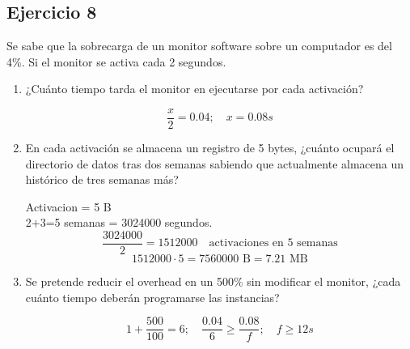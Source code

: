 \subsection{Ejercicio 8}
\noindent
Se sabe que la sobrecarga de un monitor software sobre un computador es del 4\%. Si el monitor se activa cada 2 segundos.
\begin{enumerate}
    \item ¿Cuánto tiempo tarda el monitor en ejecutarse por cada activación?
\begin{tcolorbox}[colback=white,colframe=cyan!50!black,fonttitle=\bfseries]
\[
\dfrac{x}{2}=0.04; \quad x=0.08s
\]
\end{tcolorbox}    
    \item En cada activación se almacena un registro de 5 bytes, ¿cuánto ocupará el directorio de datos tras dos semanas sabiendo que actualmente almacena un histórico de tres semanas más?
\begin{tcolorbox}[colback=white,colframe=cyan!50!black,fonttitle=\bfseries]
Activacion = 5 B\\
2+3=5 semanas = 3024000 segundos.
\[
\dfrac{3024000}{2}=1512000\quad\text{activaciones en 5 semanas}
\]
\[
1512000\cdot 5=7560000\text{ B}=7.21\text{ MB}
\]
\end{tcolorbox}    
    \item Se pretende reducir el overhead en un 500\% sin modificar el monitor, ¿cada cuánto tiempo deberán programarse las instancias?
\begin{tcolorbox}[colback=white,colframe=cyan!50!black,fonttitle=\bfseries]
\[
1+\dfrac{500}{100}=6;\quad \dfrac{0.04}{6}\geq\dfrac{0.08}{f};\quad f\geq 12s
\]
\end{tcolorbox}    
\end{enumerate}
